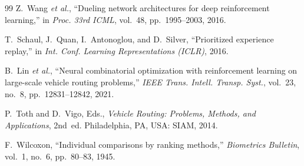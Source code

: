 \begin{thebibliography}{99}
Z.~Wang \textit{et al.},
``Dueling network architectures for deep reinforcement learning,''
in \textit{Proc. 33rd ICML}, vol.~48, pp.~1995--2003, 2016.

T.~Schaul, J.~Quan, I.~Antonoglou, and D.~Silver,
``Prioritized experience replay,''
in \textit{Int. Conf. Learning Representations (ICLR)}, 2016.

B.~Lin \textit{et al.},
``Neural combinatorial optimization with reinforcement learning on large-scale vehicle routing problems,''
\textit{IEEE Trans. Intell. Transp. Syst.}, vol.~23, no.~8, pp.~12831--12842, 2021.


P.~Toth and D.~Vigo, Eds.,
\textit{Vehicle Routing: Problems, Methods, and Applications}, 2nd~ed.
Philadelphia, PA, USA: SIAM, 2014.

F.~Wilcoxon,
``Individual comparisons by ranking methods,''
\textit{Biometrics Bulletin}, vol.~1, no.~6, pp.~80--83, 1945.

\end{thebibliography}
